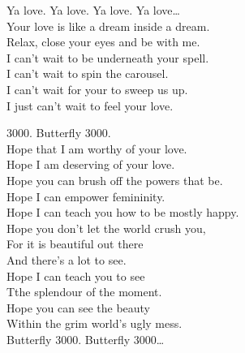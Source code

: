 Ya love. Ya love. Ya love. Ya love… \\

Your love is like a dream inside a dream. \\
Relax, close your eyes and be with me. \\

I can't wait to be underneath your spell. \\
I can't wait to spin the carousel. \\
I can't wait for your to sweep us up. \\
I just can't wait to feel your love. \\





 3000. Butterfly 3000. \\

Hope that I am worthy of your love. \\
Hope I am deserving of your love. \\
Hope you can brush off the powers that be. \\
Hope I can empower femininity. \\

Hope I can teach you how to be mostly happy. \\
Hope you don't let the world crush you, \\
For it is beautiful out there \\
And there's a lot to see. \\

Hope I can teach you to see \\
Tthe splendour of the moment. \\
Hope you can see the beauty \\
Within the grim world's ugly mess. \\

Butterfly 3000. Butterfly 3000… \\
